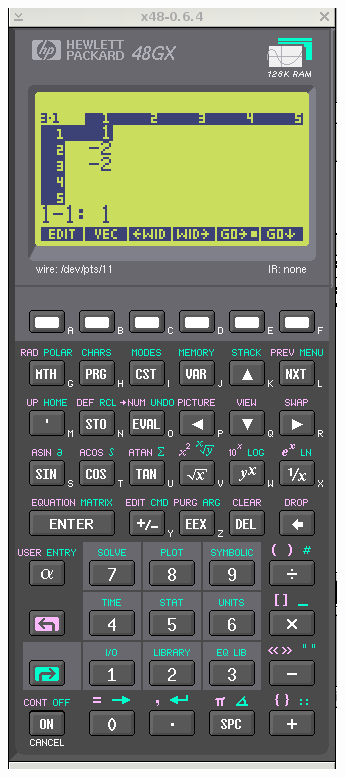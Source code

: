 \documentclass[11pt]{article}
\begin{document}
\includegraphics[scale,height=0.33\textheight]{20180422143232-linear01-p6.png}
\end{document}
